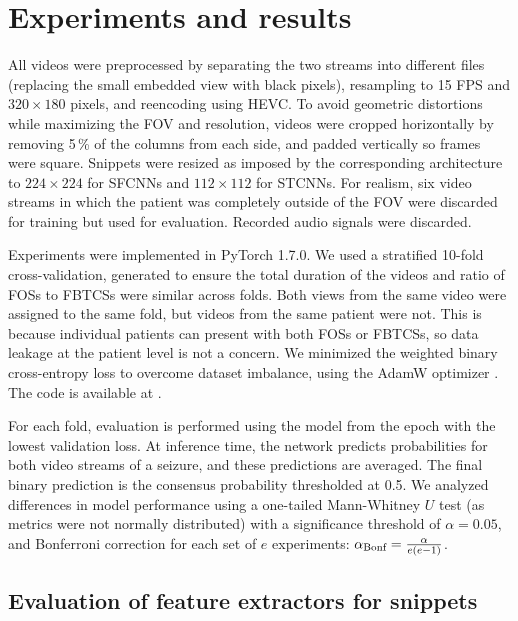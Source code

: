 \section{Experiments and results}

All videos were preprocessed by
separating the two streams into different files (replacing the small embedded view with black pixels),
resampling to 15 \ac{FPS} and $320 \times 180$ pixels,
and reencoding using \ac{HEVC}.
To avoid geometric distortions while maximizing the \ac{FOV} and resolution, videos were cropped horizontally by removing 5\,\% of the columns from each side, and padded vertically so frames were square.
Snippets were resized as imposed by the corresponding architecture to $224 \times 224$ for \acp{SFCNN} and  $112 \times 112$ for \acp{STCNN}.
For realism, six video streams in which the patient was completely outside of the \ac{FOV} were discarded for training but used for evaluation.
Recorded audio signals were discarded.

Experiments were implemented in PyTorch 1.7.0.
We used a stratified 10-fold cross-validation, generated to ensure the total duration of the videos and ratio of \acp{FOS} to \acp{FBTCS} were similar across folds.
Both views from the same video were assigned to the same fold, but videos from the same patient were not.
This is because individual patients can present with both \acp{FOS} or \acp{FBTCS}, so data leakage at the patient level is not a concern.
We minimized the weighted binary cross-entropy loss to overcome dataset imbalance, using the AdamW optimizer \cite{loshchilov_decoupled_2019}.
The code is available at .

For each fold, evaluation is performed using the model from the epoch with the lowest validation loss.
At inference time, the network predicts probabilities for both video streams of a seizure, and these predictions are averaged.
The final binary prediction is the consensus probability thresholded at 0.5.
We analyzed differences in model performance using a one-tailed Mann-Whitney $U$ test (as metrics were not normally distributed) with a significance threshold of $\alpha = 0.05$, and Bonferroni correction for each set of $e$ experiments: $\alpha_{\text{Bonf}} = \frac{\alpha}{e (e - 1)}$.


\subsection{Evaluation of feature extractors for snippets}
\label{sec:exp_feat}

